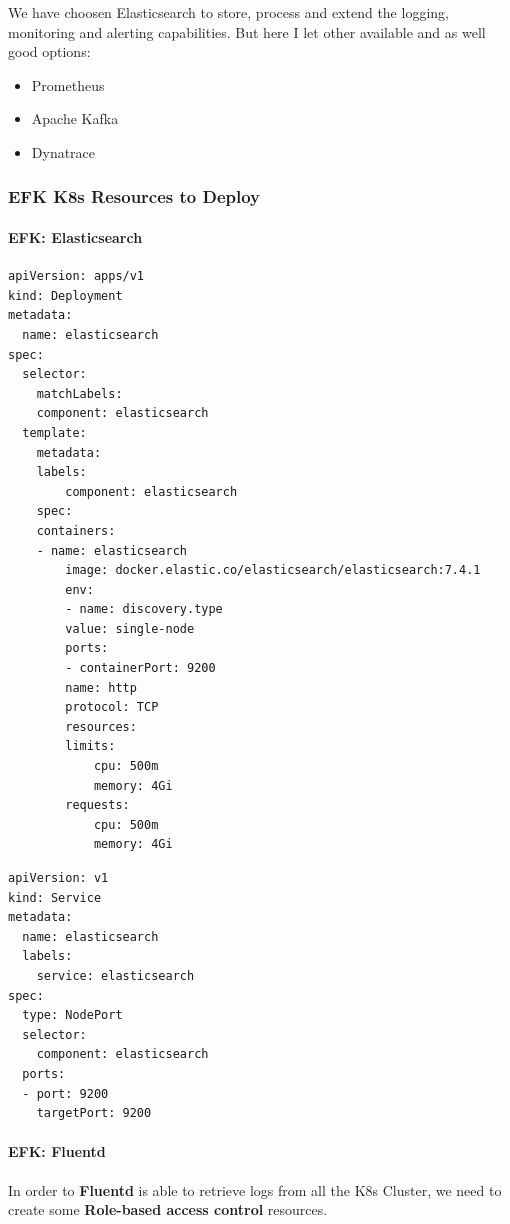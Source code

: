 \documentclass{article}
\newenvironment{codetemplate}[1][]{%
  \mybasecolorbox[#1]
  \itshape
}{%
  \endmybasecolorbox
}
\begin{document}
We have choosen Elasticsearch to store, process and extend the logging, monitoring and alerting capabilities. But here I let other available and as well good options:
\begin{itemize}
    \item Prometheus
    \item Apache Kafka
    \item Dynatrace
\end{itemize}

\subsubsection{EFK K8s Resources to Deploy}

\paragraph{EFK: Elasticsearch}
\begin{codetemplate}{}
\begin{verbatim}
apiVersion: apps/v1
kind: Deployment
metadata:
  name: elasticsearch
spec:
  selector:
	matchLabels:
  	component: elasticsearch
  template:
	metadata:
  	labels:
    	component: elasticsearch
	spec:
  	containers:
  	- name: elasticsearch
    	image: docker.elastic.co/elasticsearch/elasticsearch:7.4.1
    	env:
    	- name: discovery.type
      	value: single-node
    	ports:
    	- containerPort: 9200
      	name: http
      	protocol: TCP
    	resources:
      	limits:
        	cpu: 500m
        	memory: 4Gi
      	requests:
        	cpu: 500m
        	memory: 4Gi
\end{verbatim}
\end{codetemplate}

\begin{codetemplate}{}
\begin{verbatim}
apiVersion: v1
kind: Service
metadata:
  name: elasticsearch
  labels:
	service: elasticsearch
spec:
  type: NodePort
  selector:
	component: elasticsearch
  ports:
  - port: 9200
	targetPort: 9200
\end{verbatim}
\end{codetemplate}

\paragraph{EFK: Fluentd}

In order to \textbf{Fluentd} is able to retrieve logs from all the K8s Cluster, we need to create some \textbf{Role-based access control} resources.
\end{document}
